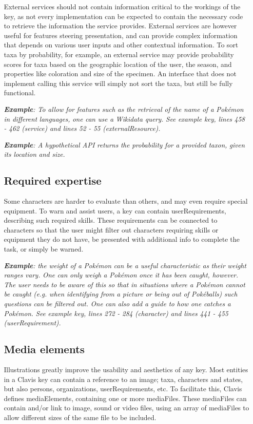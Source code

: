 \documentclass[10pt,letterpaper]{article}
\begin{document}
External services should not contain information critical to the workings of the key, as not every implementation can be expected to contain the necessary code to retrieve the information the service provides. External services are however useful for features steering presentation, and can provide complex information that depends on various user inputs and other contextual information. To sort taxa by probability, for example, an external service may provide probability scores for taxa based on the geographic location of the user, the season, and properties like coloration and size of the specimen. An interface that does not implement calling this service will simply not sort the taxa, but still be fully functional.


\textit{\textbf{Example}: To allow for features such as the retrieval of the name of a Pokémon in different languages, one can use a Wikidata query. See example key, lines 458 - 462 (service) and lines 52 - 55 (externalResource).}


\textit{\textbf{Example}: A hypothetical API returns the probability for a provided taxon, given its location and size.}
\subsection*{
Required expertise
}
Some characters are harder to evaluate than others, and may even require special equipment. To warn and assist users, a key can contain userRequirements, describing such required skills. These requirements can be connected to characters so that the user might filter out characters requiring skills or equipment they do not have, be presented with additional info to complete the task, or simply be warned.


\textit{\textbf{Example}: the weight of a Pokémon can be a useful characteristic as their weight ranges vary. One can only weigh a Pokémon once it has been caught, however. The user needs to be aware of this so that in situations where a Pokémon cannot be caught (e.g. when identifying from a picture or being out of Pokéballs) such questions can be filtered out. One can also add a guide to how one catches a Pokémon. See example key, lines 272 - 284 (character) and lines 441 - 455 (userRequirement).}

\subsection*{
Media elements
}
Illustrations greatly improve the usability and aesthetics of any key. Most entities in a Clavis key can contain a reference to an image; taxa, characters and states, but also persons, organizations, userRequirements, etc. To facilitate this, Clavis defines mediaElements, containing one or more mediaFiles. These mediaFiles can contain and/or link to image, sound or video files, using an array of mediaFiles to allow different sizes of the same file to be included.
\end{document}
